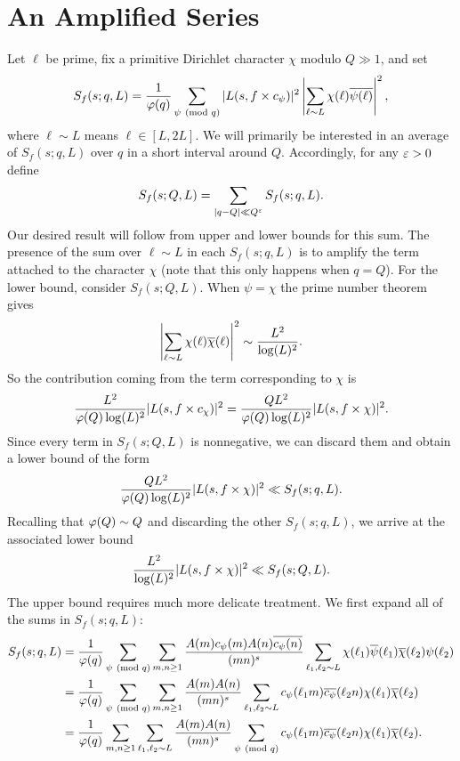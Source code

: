 \documentclass[12pt,reqno,oneside]{amsart}
\begin{document}
\section{An Amplified Series}
  Let $\ell$ be prime, fix a primitive Dirichlet character $\chi$ modulo $Q \gg 1$, and set
  \[
    S_{f}(s;q,L) = \frac{1}{\varphi(q)}\sum_{\psi \ \left(\text{mod }q\right)}|L(s,f \times c_{\psi})|^{2}\left|\sum_{\ell \sim L}\chi(\ell)\overline{\psi(\ell)}\right|^{2},
  \]
  where $\ell \sim L$ means $\ell \in [L,2L]$. We will primarily be interested in an average of $S_{f}(s;q,L)$ over $q$ in a short interval around $Q$. Accordingly, for any $\varepsilon > 0$ define
  \[
    S_{f}(s;Q,L) = \sum_{|q-Q| \ll Q^{\varepsilon}}S_{f}(s;q,L).
  \]
  Our desired result will follow from upper and lower bounds for this sum. The presence of the sum over $\ell \sim L$ in each $S_{f}(s;q,L)$ is to amplify the term attached to the character $\chi$ (note that this only happens when $q = Q$). For the lower bound, consider $S_{f}(s;Q,L)$. When $\psi = \chi$ the prime number theorem gives
  \[
    \left|\sum_{\ell \sim L}\chi(\ell)\overline{\chi}(\ell)\right|^{2} \sim \frac{L^{2}}{\log(L)^{2}}.
  \]
  So the contribution coming from the term corresponding to $\chi$ is
  \[
    \frac{L^{2}}{\varphi(Q)\log(L)^{2}}|L(s,f \times c_{\chi})|^{2} = \frac{QL^{2}}{\varphi(Q)\log(L)^{2}}|L(s,f \times \chi)|^{2}. 
  \]
  Since every term in $S_{f}(s;Q,L)$ is nonnegative, we can discard them and obtain a lower bound of the form
  \[
    \frac{QL^{2}}{\varphi(Q)\log(L)^{2}}|L(s,f \times \chi)|^{2} \ll S_{f}(s;q,L).
  \]
  Recalling that $\varphi(Q) \sim Q$ and discarding the other $S_{f}(s;q,L)$, we arrive at the associated lower bound
  \[
    \frac{L^{2}}{\log(L)^{2}}|L(s,f \times \chi)|^{2} \ll S_{f}(s;Q,L).
  \]
  The upper bound requires much more delicate treatment. We first expand all of the sums in $S_{f}(s;q,L)$:
  \begin{align*}
    S_{f}(s;q,L) &= \frac{1}{\varphi(q)}\sum_{\psi \ \left(\text{mod }q\right)}\sum_{m,n \ge 1}\frac{A(m)c_{\psi}(m)A(n)\overline{c_{\psi}(n)}}{(mn)^{s}}\sum_{\ell_{1},\ell_{2} \sim L}\chi(\ell_{1})\overline{\psi}(\ell_{1})\overline{\chi}(\ell_{2})\psi(\ell_{2}) \\
    &= \frac{1}{\varphi(q)}\sum_{\psi \ \left(\text{mod }q\right)}\sum_{m,n \ge 1}\frac{A(m)A(n)}{(mn)^{s}}\sum_{\ell_{1},\ell_{2} \sim L}c_{\psi}(\ell_{1}m)\overline{c_{\psi}}(\ell_{2}n)\chi(\ell_{1})\overline{\chi}(\ell_{2}) \\
    &= \frac{1}{\varphi(q)}\sum_{m,n \ge 1}\sum_{\ell_{1},\ell_{2} \sim L}\frac{A(m)A(n)}{(mn)^{s}}\sum_{\psi \ \left(\text{mod }q\right)}c_{\psi}(\ell_{1}m)\overline{c_{\psi}}(\ell_{2}n)\chi(\ell_{1})\overline{\chi}(\ell_{2}).
  \end{align*}
\end{document}
